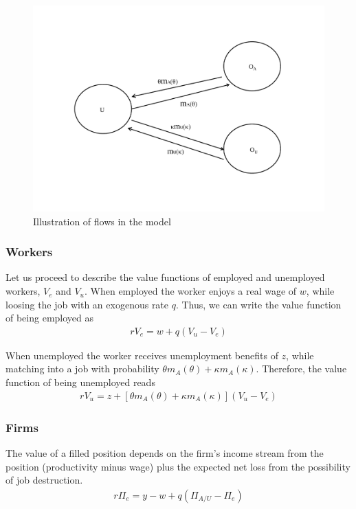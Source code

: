 \documentclass[11pt,article]{memoir}
\begin{document}
\begin{figure}
\includegraphics[width=\textwidth]{figures/flow_illustration.pdf}
\caption{Illustration of flows in the model}
\end{figure}

\subsubsection{Workers}

Let us proceed to describe the value functions of employed and unemployed workers, $V_e$ and $V_u$. When employed the worker enjoys a real wage of $w$, while loosing the job with an exogenous rate $q$. Thus, we can write the value function of being employed as
\begin{align}
r V_e= w+ q\left( V_u-V_e \right) 
\label{eq:rVe}
\end{align}

When unemployed the worker receives unemployment benefits of $z$, while matching into a job with probability $\theta m_A \left( \theta \right)+\kappa m_A \left( \kappa \right)$. Therefore, the value function of being unemployed reads
\begin{align}
r V_u= z+ \left[  \theta m_A \left( \theta \right)+\kappa m_A \left( \kappa \right) \right] \left( V_u-V_e \right) 
\label{eq:rVu}
\end{align}

\subsubsection{Firms}
\label{model:firm}

The value of a filled position depends on the firm's income stream from the position (productivity minus wage) plus the expected net loss from the possibility of job destruction.
\begin{align}
r \Pi_e=y-w+q \left( \Pi_{A/U}-\Pi_e \right)
\label{eq:rPie}
\end{align}
\end{document}
